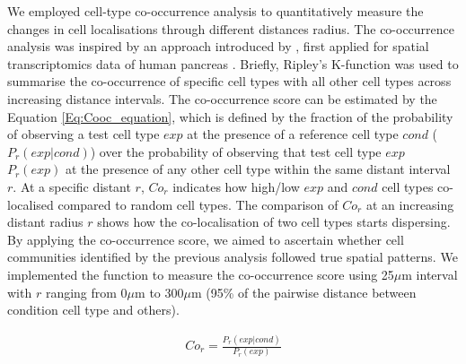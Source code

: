 We employed cell-type co-occurrence analysis to quantitatively measure the changes in cell localisations through different distances radius. The co-occurrence analysis was inspired by an approach introduced by \cite{tosti2021single}, first applied for spatial transcriptomics data of human pancreas \cite{tosti2021single}. Briefly, Ripley's K-function was used to summarise the co-occurrence of specific cell types with all other cell types across increasing distance intervals. The co-occurrence score can be estimated by the Equation \ref{Eq:Cooc_equation}, which is defined by the fraction of the probability of observing a test cell type $exp$ at the presence of a reference cell type $cond$ ($P_{r}(exp|cond)$) over the probability of observing that test cell type $exp$ $P_{r}(exp)$ at the presence of any other cell type within the same distant interval $r$. At a specific distant $r$, $Co_{r}$ indicates how high/low $exp$ and $cond$ cell types co-localised compared to random cell types. The comparison of $Co_{r}$ at an increasing distant radius $r$ shows how the co-localisation of two cell types starts dispersing. By applying the co-occurrence score, we aimed to ascertain whether cell communities identified by the previous analysis followed true spatial patterns. We implemented the function to measure the co-occurrence score using 25$\mu$m interval with $r$ ranging from 0$\mu$m to 300$\mu$m (95\% of the pairwise distance between condition cell type and others). 


\begin{align}
\label{Eq:Cooc_equation}
Co_{r} = \frac{P_{r}(exp|cond)}{P_{r}(exp)} 
\end{align}

 

